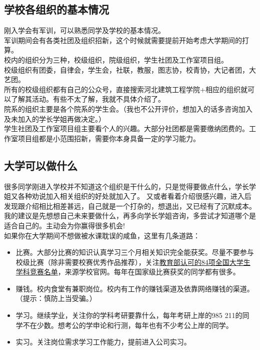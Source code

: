 \documentclass[12pt]{article} %
\begin{document}
	\subsection{学校各组织的基本情况}
	刚入学会有军训，可以熟悉同学及学校的基本情况。\\
	
	军训期间会有各类社团及组织招新，这个时候就需要提前开始考虑大学期间的打算。\\
	
	校内的组织分为三种，校级组织，院级组织，学生社团及工作室项目组。\\
	
	
	校级组织有团委，自律会，学生会，社联，教服，图志协，校青协，大记者团，大艺团。\\
	
	所有的校级组织都有自己的公众号，直接搜索河北建筑工程学院+相应的组织就可以了解其活动。有些不太了解，我就不具体介绍了。\\
	
	院系的组织主要是各个院系的学生会。（我也不公开评价，想加入的话多咨询加入及未加入的学长学姐再做决定。）\\
	
	学生社团及工作室项目组主要看个人的兴趣。大部分社团都是需要缴纳团费的。工作室项目组都是小范围招新，需要你本身具备一定的学习能力。\\
	
	\subsection{大学可以做什么}
	很多同学刚进入学校并不知道这个组织是干什么的，只是觉得要做点什么，学长学姐又各种劝说加入相关组织的好处就加入了。
	又或者看着介绍很感兴趣，进入后发现跟介绍相比相差甚远，自己就是一个打杂的，想退出，又已经有了沉默成本。\\
	
	我的建议是先想想自己未来要做什么，再多向学长学姐咨询，多尝试才知道哪个是适合自己的。主动会为你赢得很多机会!\\
	
	如果你在大学期间不想做被水课耽误的咸鱼，这里有几条道路：
	
	\begin{itemize}
		\item 比赛。大部分比赛的知识认真学习三个月相关知识完全能获奖。尽量不要参与校级比赛（除非需要校赛优秀作品推荐），关注\href{https://tieba.baidu.com/p/9062077312?pn=1}{教育部认可的84项全国大学生学科竞赛名单}，来源学校官网。每年在国家级比赛获奖的同学都有很多。
		\item 赚钱。校内食堂有兼职岗位。校内有工作的赚钱渠道及依靠网络赚钱的渠道。（提示：慎防上当受骗。）
		\item 学习。继续学业，关注你的学科考研要靠什么，每年考研上岸的985 211的同学不在少数。想考公的学申论和行测，每年也有不少考公上岸的同学。
		\item 实习。关注岗位需求学习工作能力，提前进入公司实习。
	\end{itemize}
	
\end{document}
